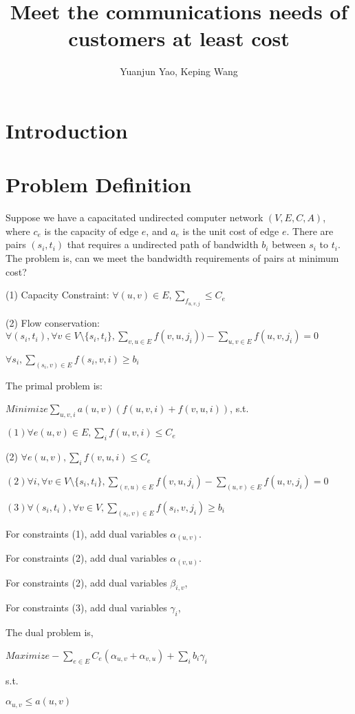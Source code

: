 \documentclass[a4paper]{article}
\title{Meet the communications needs of customers at least cost}
\author{Yuanjun Yao, Keping Wang}
\begin{document}
\maketitle


\section{Introduction}


\section{Problem Definition}

Suppose we have a capacitated  undirected computer network $(V, E, C, A)$,
where $c_e$ is the capacity of edge $e$, and $a_e$ is the unit cost of edge $e$. There are pairs $(s_i,t_i)$ that requires a undirected path of bandwidth $b_i$ between $s_i$ to $t_i$. The problem is, can we meet the bandwidth requirements of pairs at minimum cost?

(1) Capacity Constraint: $\forall (u,v)\in E, \sum_{f_{u,v,j}}\leq C_e$

(2) Flow conservation: $\forall(s_i, t_i), \forall v\in {V\setminus\{s_i,t_i\}}, \sum_{v,u\in E}f(v,u,j_i))-\sum_{u,v\in E}f(u,v,j_i)=0$

 $\forall s_i,\sum_{(s_i,v)\in E}f(s_i,v,i)\geq b_i$

The primal problem is:

$Minimize \sum _{u,v,i}a(u,v)(f(u,v,i)+f(v,u,i))$, s.t.

$(1) \forall e(u,v)\in E, \sum_{i}f(u,v,i)\leq C_e$

(2) $\forall e(u,v), \sum_{i}f(v,u,i)\leq C_e$

$(2) \forall i, \forall v\in V\setminus\{s_i,t_i\}, \sum_{(v,u)\in E}f(v,u,j_i)-\sum_{(u,v)\in E}f(u,v,j_i)=0$


$(3) \forall (s_i,t_i), \forall v\in V, \sum_{(s_i,v)\in E}f(s_i,v,j_i) \geq b_i$

For constraints (1), add dual variables $\alpha_(u,v)$. 

For constraints (2), add dual variables $\alpha_(v,u)$. 

For constraints (2), add dual variables $\beta_{i,v}$, 

For constraints (3), add dual variables $\gamma_{i}$, 

The dual problem is, 

$Maximize -\sum_{e\in E}C_e(\alpha_{u,v}+\alpha_{v,u})+\sum_{i}b_i\gamma_i$

s.t.

$ \alpha_{u,v} \leq a(u,v)$
\end{document}
